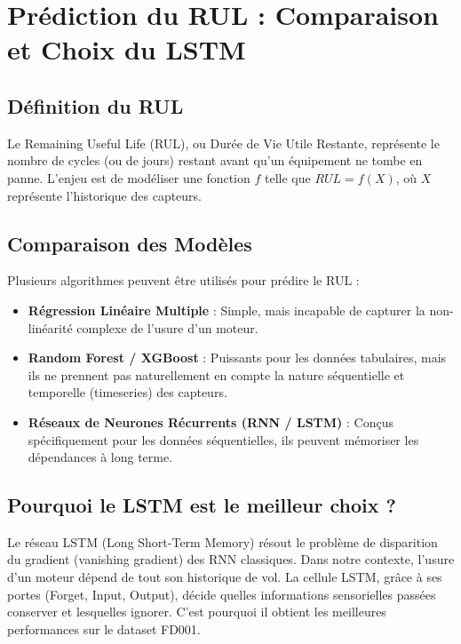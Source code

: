 \documentclass[12pt,a4paper]{report}
\begin{document}
\chapter{Prédiction du RUL : Comparaison et Choix du LSTM}

\section{Définition du RUL}
Le Remaining Useful Life (RUL), ou Durée de Vie Utile Restante, représente le nombre de cycles (ou de jours) restant avant qu'un équipement ne tombe en panne. L'enjeu est de modéliser une fonction $f$ telle que $RUL = f(X)$, où $X$ représente l'historique des capteurs.

\section{Comparaison des Modèles}
Plusieurs algorithmes peuvent être utilisés pour prédire le RUL :
\begin{itemize}
    \item \textbf{Régression Linéaire Multiple} : Simple, mais incapable de capturer la non-linéarité complexe de l'usure d'un moteur.
    \item \textbf{Random Forest / XGBoost} : Puissants pour les données tabulaires, mais ils ne prennent pas naturellement en compte la nature séquentielle et temporelle (timeseries) des capteurs.
    \item \textbf{Réseaux de Neurones Récurrents (RNN / LSTM)} : Conçus spécifiquement pour les données séquentielles, ils peuvent mémoriser les dépendances à long terme.
\end{itemize}

\section{Pourquoi le LSTM est le meilleur choix ?}
Le réseau LSTM (Long Short-Term Memory) résout le problème de disparition du gradient (vanishing gradient) des RNN classiques. Dans notre contexte, l'usure d'un moteur dépend de tout son historique de vol. La cellule LSTM, grâce à ses portes (Forget, Input, Output), décide quelles informations sensorielles passées conserver et lesquelles ignorer. C'est pourquoi il obtient les meilleures performances sur le dataset FD001.
\end{document}

